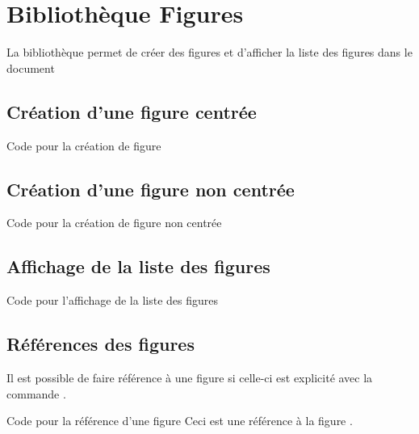 \chapter{Bibliothèque Figures}

La bibliothèque  permet de créer des figures et d'afficher la liste des figures dans le document

\section{Création d'une figure centrée}


\begin{Latex}{Code pour la création de figure}
\end{Latex}



\section{Création d'une figure non centrée}


\begin{Latex}{Code pour la création de figure non centrée}
\end{Latex}

\section{Affichage de la liste des figures}

\begin{Latex}{Code pour l'affichage de la liste des figures}
\end{Latex}



\section{Références des figures}

Il est possible de faire référence à une figure si celle-ci est explicité avec la commande .\\


\begin{Latex}{Code pour la référence d'une figure}
  Ceci est une référence à la figure .
\end{Latex}

